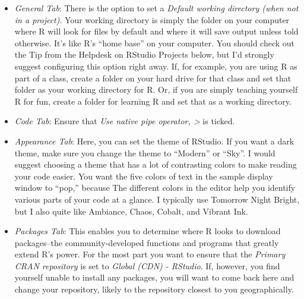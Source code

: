 \documentclass[
  letterpaper,
]{book}
\providecommand{\tightlist}{%
  \setlength{\itemsep}{0pt}\setlength{\parskip}{0pt}}\usepackage{longtable,booktabs,array}
\begin{document}
\begin{itemize}
  \begin{itemize}
  \tightlist
  \item
    \emph{General Tab}: There is the option to set a \emph{Default
    working directory (when not in a project)}. Your working directory
    is simply the folder on your computer where R will look for files by
    default and where it will save output unless told otherwise. It's
    like R's ``home base'' on your computer. You should check out the
    Tip from the Helpdesk on RStudio Projects below, but I'd strongly
    suggest configuring this option right away. If, for example, you are
    using R as part of a class, create a folder on your hard drive for
    that class and set that folder as your working directory for R. Or,
    if you are simply teaching yourself R for fun, create a folder for
    learning R and set that as a working directory.
  \item
    \emph{Code Tab}: Ensure that \emph{Use native pipe operator,
    \textbar\textgreater{}} is ticked.
  \item
    \emph{Appearance Tab}: Here, you can set the theme of RStudio. If
    you want a dark theme, make sure you change the theme to ``Modern''
    or ``Sky''. I would suggest choosing a theme that has a lot of
    contrasting colors to make reading your code easier. You want the
    five colors of text in the sample display window to ``pop,'' because
    The different colors in the editor help you identify various parts
    of your code at a glance. I typically use Tomorrow Night Bright, but
    I also quite like Ambiance, Chaos, Cobalt, and Vibrant Ink.
  \item
    \emph{Packages Tab}: This enables you to determine where R looks to
    download packages--the community-developed functions and programs
    that greatly extend R's power. For the most part you want to ensure
    that the \emph{Primary CRAN repository} is set to \emph{Global (CDN)
    - RStudio}. If, however, you find yourself unable to install any
    packages, you will want to come back here and change your
    repository, likely to the repository closest to you geographically.
  \end{itemize}
\end{itemize}
\end{document}
